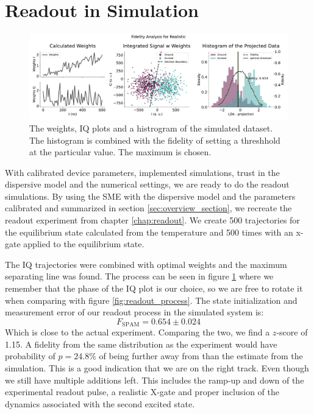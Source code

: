 \section{Readout in Simulation}\label{sec:readout_in_simulation}
\begin{figure}[t]
    \centering
    \includegraphics[]{Simulations/budgets/figures/realistic_sme.pdf}
    \caption{The weights, IQ plots and a histrogram of the simulated dataset. The histogram is combined with the fidelity of setting a threshhold at the particular value. The maximum is chosen.}
    \label{fig:simulation_readout}
\end{figure}
With calibrated device parameters, implemented simulations, trust in the dispersive model and the numerical settings, we are ready to do the readout simulations. By using the SME with the dispersive model and the parameters calibrated and summarized in section \ref{sec:overview_section}, we recreate the readout experiment from chapter \ref{chap:readout}. We create 500 trajectories for the equilibrium state calculated from the temperature and 500 times with an x-gate applied to the equilibrium state.

The IQ trajectories were combined with optimal weights and the maximum separating line was found. The process can be seen in figure \ref{fig:simulation_readout} where we remember that the phase of the IQ plot is our choice, so we are free to rotate it when comparing with figure \ref{fig:readout_process}. The state initialization and measurement error of our readout process in the simulated system is:
\begin{equation}
    F_{\text{SPAM}} = 0.654 \pm 0.024
\end{equation}
Which is close to the actual experiment. Comparing the two, we find a $z$-score of 1.15. A fidelity from the same distribution as the experiment would have probability of  $p = 24.8 \%$ of being further away from than the estimate from the simulation. This is a good indication that we are on the right track. Even though we still have multiple additions left. This includes the ramp-up and down of the experimental readout pulse, a realistic X-gate and proper inclusion of the dynamics associated with the second excited state. 



